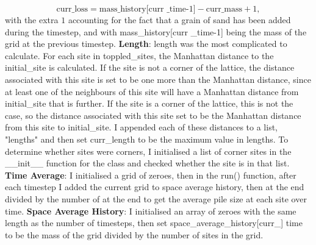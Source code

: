 \documentclass{article}
\begin{document}
\[\text{curr\_loss} = \text{mass\_history[curr
\_time-1]} - \text{curr\_mass} + 1,\] with the extra $1$ accounting for the fact that a grain of sand has been added during the timestep, and with mass\_history[curr
\_time-1] being the mass of the grid at the previous timestep. 
\newline
\newline
\textbf{Length}: length was the most complicated to calculate. For each site in toppled\_sites, the Manhattan distance to the initial\_site is calculated. If the site is not a corner of the lattice, the distance associated with this site is set to be one more than the Manhattan distance, since at least one of the neighbours of this site will have a Manhattan distance from initial\_site that is further. If the site is a corner of the lattice, this is not the case, so the distance associated with this site set to be the Manhattan distance from this site to initial\_site. I appended each of these distances to a list, "lengths" and then set curr\_length to be the maximum value in lengths. To determine whether sites were corners, I initialised a list of corner sites in the \_\_init\_\_ function for the class and checked whether the site is in that list. 
\newline
\newline
\textbf{Time Average}: I initialised a grid of zeroes, then in the run() function, after each timestep I added the current grid to space average history, then at the end divided by the number of at the end to get the average pile size at each site over time.
\newline
\newline
\textbf{Space Average History}: I initialised an array of zeroes with the same length as the number of timesteps, then set space\_average\_history[curr\_]  time  to be the mass of the grid divided by the number of sites in the grid. 
\end{document}

